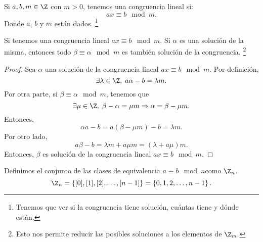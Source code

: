 \begin{fdefinition}
\normalfont Si $\displaystyle a,b,m \in \Z $ con $\displaystyle m >0 $, tenemos una congruencia lineal si:
\[a x \equiv b \mod m .\]
Donde $\displaystyle a $, $\displaystyle b $ y $\displaystyle m $ están dados. \footnote{Tenemos que ver si la congruencia tiene solución, cuántas tiene y dónde están.} 
\end{fdefinition}

\begin{fprop}[]
\normalfont Si tenemos una congruencia lineal $\displaystyle ax \equiv b \mod m $. Si $\displaystyle \alpha  $ es una solución de la misma, entonces todo $\displaystyle \beta \equiv \alpha \mod m $ es también solución de la congruencia. \footnote{Esto nos permite reducir las posibles soluciones a los elementos de $\displaystyle \Z_{m}. $ } 
\end{fprop}

\begin{proof}
Sea $\displaystyle \alpha  $ una solución de la congruencia lineal $\displaystyle ax \equiv b \mod m $. Por definición, 
\[\exists \lambda \in \Z, \; a \alpha - b = \lambda m .\]
Por otra parte, si $\displaystyle \beta \equiv \alpha\mod m $, tenemos que 
\[\exists \mu \in \Z, \; \beta - \alpha = \mu m \Rightarrow \alpha = \beta - \mu m .\]
Entonces, 
\[\alpha a - b = a\left(\beta - \mu m\right) - b = \lambda m .\]
Por otro lado, 
\[a \beta - b = \lambda m + a \mu m = \left(\lambda + a \mu\right) m .\]
Entonces, $\displaystyle \beta  $ es solución de la congruencia lineal $\displaystyle ax \equiv b \mod m $.
\end{proof}

\begin{fdefinition}[]
\normalfont 
Definimos el conjunto de las clases de equivalencia $\displaystyle a \equiv b \mod n $como $\displaystyle \Z_{n} $. 
\[\Z_{n} = \left\{ [0], [1], [2], \ldots, [n-1] \right\} = \left\{ 0, 1, 2, \ldots, n-1\right\}   .\]
\end{fdefinition}

